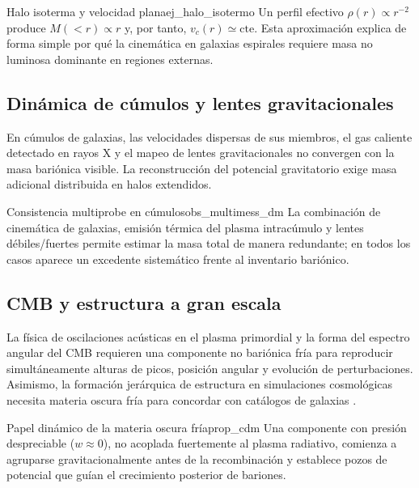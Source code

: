 \begin{ejemplo}{Halo isoterma y velocidad plana}{ej_halo_isotermo}
Un perfil efectivo $\rho(r)\propto r^{-2}$ produce $M(<r)\propto r$ y, por tanto, $v_c(r)\simeq\text{cte}$. Esta aproximación explica de forma simple por qué la cinemática en galaxias espirales requiere masa no luminosa dominante en regiones externas.
\end{ejemplo}

\subsection{Dinámica de cúmulos y lentes gravitacionales}

En cúmulos de galaxias, las velocidades dispersas de sus miembros, el gas caliente detectado en rayos X y el mapeo de lentes gravitacionales no convergen con la masa bariónica visible. La reconstrucción del potencial gravitatorio exige masa adicional distribuida en halos extendidos.

\begin{observacion}{Consistencia multiprobe en cúmulos}{obs_multimess_dm}
La combinación de cinemática de galaxias, emisión térmica del plasma intracúmulo y lentes débiles/fuertes permite estimar la masa total de manera redundante; en todos los casos aparece un excedente sistemático frente al inventario bariónico.
\end{observacion}

\subsection{CMB y estructura a gran escala}

La física de oscilaciones acústicas en el plasma primordial y la forma del espectro angular del CMB requieren una componente no bariónica fría para reproducir simultáneamente alturas de picos, posición angular y evolución de perturbaciones. Asimismo, la formación jerárquica de estructura en simulaciones cosmológicas necesita materia oscura fría para concordar con catálogos de galaxias \cite{Dodelson2003, Planck2020}.

\begin{proposicion}{Papel dinámico de la materia oscura fría}{prop_cdm}
Una componente con presión despreciable ($w\approx 0$), no acoplada fuertemente al plasma radiativo, comienza a agruparse gravitacionalmente antes de la recombinación y establece pozos de potencial que guían el crecimiento posterior de bariones.
\end{proposicion}

